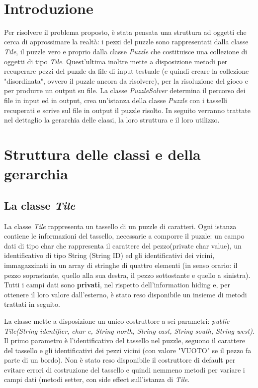 \documentclass{article}
\title{
\vspace{2in}
\textmd{\textbf{\hmwkTitle}}\\
\textmd{\hmwkClass}\\
\normalsize\vspace{0.1in}\small{\hmwkDueDate}\\
\vspace{0.1in}\large{\textit{\hmwkClassInstructor\ \hmwkClassTime}}
\vspace{3in}
}
\author{\textbf{\hmwkAuthorName}}
\date{} %
\begin{document}
\maketitle

\newpage
\section{Introduzione}
Per risolvere il problema proposto, è stata pensata una struttura ad oggetti che cerca di approssimare la realtà: i pezzi del puzzle sono rappresentati dalla classe \textit{Tile}, il puzzle vero e proprio dalla classe \textit{Puzzle} che costituisce una collezione di oggetti di tipo \textit{Tile}. Quest'ultima inoltre mette a disposizione metodi per recuperare pezzi del puzzle da file di input testuale (e quindi creare la collezione "disordinata", ovvero il puzzle ancora da risolvere), per la risoluzione del gioco e per produrre un output su file. La classe \textit{PuzzleSolver} determina il percorso dei file in input ed in output, crea un'istanza della classe \textit{Puzzle} con i tasselli recuperati e scrive sul file in output il puzzle risolto. In seguito verranno trattate nel dettaglio la gerarchia delle classi, la loro struttura e il loro utilizzo. 

\section{Struttura delle classi e della gerarchia}
\subsection{La classe \textit{Tile}}
La classe \textit{Tile} rappresenta un tassello di un puzzle di caratteri. Ogni istanza contiene le informazioni del tassello, necessarie a comporre il puzzle: un campo dati di tipo char che rappresenta il carattere del pezzo(private char value), un identificativo di tipo String (String ID) ed gli identificativi dei vicini, immagazzinati in un array di stringhe di quattro elementi (in senso orario: il pezzo soprastante, quello alla sua destra, il pezzo sottostante e quello a sinistra). Tutti i campi dati sono \textbf{privati}, nel rispetto dell'information hiding e, per ottenere il loro valore dall'esterno, è stato reso disponibile un insieme di metodi trattati in seguito.\par
La classe mette a disposizione un unico costruttore a sei parametri: \textit{public Tile(String identifier, char c, String north, String east, String south, String west)}. Il primo parametro è l'identificativo del tassello nel puzzle, seguono il carattere del tassello e gli identificativi dei pezzi vicini (con valore "VUOTO" se il pezzo fa parte di un bordo). Non è stato reso disponibile il costruttore di default per evitare errori di costruzione del tassello e quindi nemmeno metodi per variare i campi dati (metodi setter, con side effect sull'istanza di \textit{Tile}.
\end{document}
